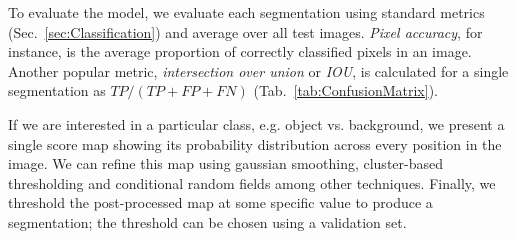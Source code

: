 To evaluate the model, we evaluate each segmentation using standard metrics (Sec.~\ref{sec:Classification}) and average over all test images. \emph{Pixel accuracy}, for instance, is the average proportion of correctly classified pixels in an image.
Another popular metric, \emph{intersection over union} or \emph{IOU}, is calculated for a single segmentation as $TP/(TP+FP+FN)$ (Tab.~\ref{tab:ConfusionMatrix}).

If we are interested in a particular class, e.g. object vs. background, we present a single score map showing its probability distribution across every position in the image. We can refine this map using gaussian smoothing, cluster-based thresholding and conditional random fields among other techniques. Finally, we threshold the post-processed map at some specific value to produce a segmentation; the threshold can be chosen using a validation set.
